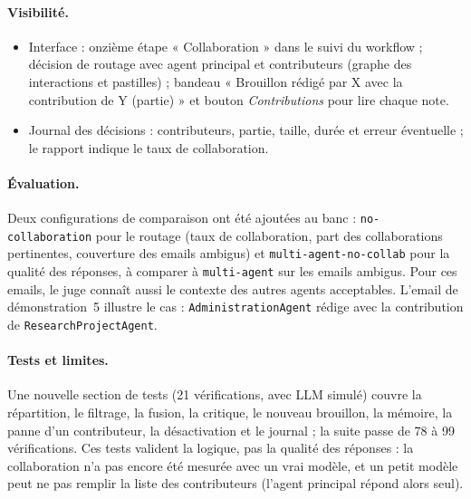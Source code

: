 \documentclass[11pt,a4paper]{article}
\newcommand{\code}[1]{\texttt{#1}}
\begin{document}
\paragraph{Visibilité.}
\begin{itemize}
  \item Interface : onzième étape « Collaboration » dans le suivi du workflow ; décision de
        routage avec agent principal et contributeurs (graphe des interactions et pastilles) ;
        bandeau « Brouillon rédigé par X avec la contribution de Y (partie) » et bouton
        \emph{Contributions} pour lire chaque note.
  \item Journal des décisions : contributeurs, partie, taille, durée et erreur éventuelle ;
        le rapport indique le taux de collaboration.
\end{itemize}

\paragraph{Évaluation.} Deux configurations de comparaison ont été ajoutées au banc :
\code{no-collaboration} pour le routage (taux de collaboration, part des collaborations
pertinentes, couverture des emails ambigus) et \code{multi-agent-no-collab} pour la
qualité des réponses, à comparer à \code{multi-agent} sur les emails ambigus. Pour ces
emails, le juge connaît aussi le contexte des autres agents acceptables. L'email de
démonstration~5 illustre le cas : \code{AdministrationAgent} rédige avec la contribution
de \code{ResearchProjectAgent}.

\paragraph{Tests et limites.} Une nouvelle section de tests (21 vérifications, avec LLM
simulé) couvre la répartition, le filtrage, la fusion, la critique, le nouveau brouillon,
la mémoire, la panne d'un contributeur, la désactivation et le journal ; la suite passe
de 78 à 99 vérifications. Ces tests valident la logique, pas la qualité des réponses : la
collaboration n'a pas encore été mesurée avec un vrai modèle, et un petit modèle peut ne
pas remplir la liste des contributeurs (l'agent principal répond alors seul).
\end{document}
